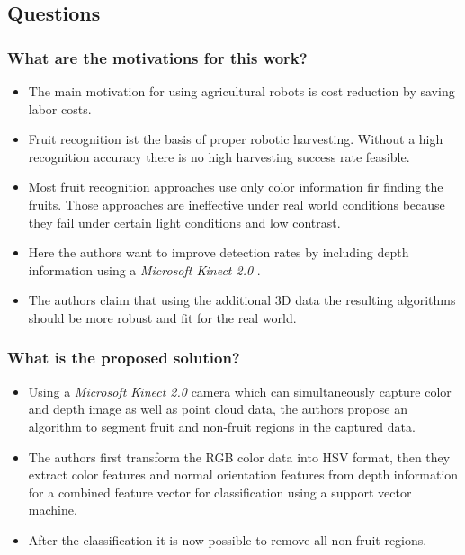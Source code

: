 \documentclass{article}
\begin{document}
\subsection*{Questions}
\subsubsection*{What are the motivations for this work?}
\begin{itemize}
    \item The main motivation for using agricultural robots is cost reduction by saving labor costs.
    \item Fruit recognition ist the basis of proper robotic harvesting. Without a high recognition accuracy there is no high harvesting success rate feasible.
    \item Most fruit recognition approaches use only color information fir finding the fruits. Those approaches are ineffective under real world conditions because they fail under certain light conditions and low contrast. 
    \item Here the authors want to improve detection rates by including depth information using a \emph{Microsoft Kinect 2.0} .
    \item The authors claim that using the additional 3D data the resulting algorithms should be more robust and fit for the real world.
\end{itemize}
\subsubsection*{What is the proposed solution?}
\begin{itemize}
    \item Using a \emph{Microsoft Kinect 2.0} camera which can simultaneously capture color and depth image as well as point cloud data, the authors propose an algorithm to segment fruit and non-fruit regions in the captured data.
    \item The authors first transform the RGB color data into HSV format, then they extract color features and normal orientation features from depth information for a combined feature vector for classification using a support vector machine.
    \item After the classification it is now possible to remove all non-fruit regions.
\end{itemize}
\end{document}
